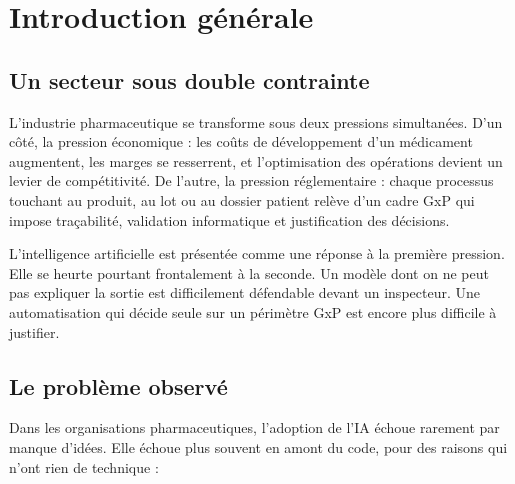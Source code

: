 \chapter*{Introduction générale}
\label{chap:introduction}

\section*{Un secteur sous double contrainte}

L'industrie pharmaceutique se transforme sous deux pressions simultanées. D'un côté,
la pression économique : les coûts de développement d'un médicament augmentent, les
marges se resserrent, et l'optimisation des opérations devient un levier de
compétitivité. De l'autre, la pression réglementaire : chaque processus touchant au
produit, au lot ou au dossier patient relève d'un cadre GxP qui impose traçabilité,
validation informatique et justification des décisions.

L'intelligence artificielle est présentée comme une réponse à la première pression.
Elle se heurte pourtant frontalement à la seconde. Un modèle dont on ne peut pas
expliquer la sortie est difficilement défendable devant un inspecteur. Une
automatisation qui décide seule sur un périmètre GxP est encore plus difficile à
justifier.

\section*{Le problème observé}

Dans les organisations pharmaceutiques, l'adoption de l'IA échoue rarement par manque
d'idées. Elle échoue plus souvent en amont du code, pour des raisons qui n'ont rien de
technique :

